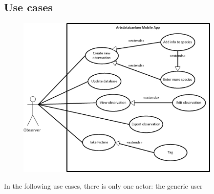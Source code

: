 \clearpage
\subsection{Use cases}
\label{sec:usecases}

\begin{figure}[!htb]
	\centering
	\includegraphics[width=0.9\textwidth]{reqspec/mainusecase.jpg}
	\label{fig:usecase}
\end{figure}

In the following use cases, there is only one actor: the generic user

\clearpage

